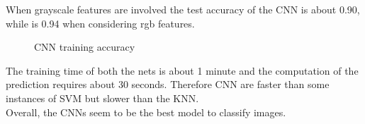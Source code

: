 \documentclass{article}
\begin{document}
When grayscale features are involved the test accuracy of the CNN is about 0.90, while is 0.94 when considering rgb features.
\begin{figure}[H] 
  \begin{adjustwidth}{-4cm}{-4cm}
     \centering
     \caption{CNN training accuracy} \label{cnn} 
      \end{adjustwidth}
   \end{figure}
\noindent The training time of both the nets is about 1 minute and the computation of the prediction requires about 30 seconds. Therefore CNN are faster than some instances of SVM but slower than the KNN.\\
Overall, the CNNs seem to be the best model to classify images.
\end{document}
